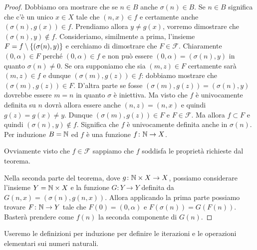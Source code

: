 \begin{proof}
Dobbiamo ora mostrare che se $n\in B$ anche $\sigma(n)\in B$.
Se $n\in B$ significa che c'è un unico $x\in X$ tale che $(n,x)\in f$
e certamente anche $(\sigma(n),g(x))\in f$.
Prendiamo allora $y\neq g(x)$, vorremo dimostrare che $(\sigma(n),y)\not \in f$.
Consideriamo, similmente a prima, l'insieme $F=f\setminus{\left\{ (\sigma(n),y) \right\}}$
e cerchiamo di dimostrare che $F\in \mathcal F$.
Chiaramente $(0,\alpha)\in F$ perché $(0,\alpha)\in f$ 
e non può essere $(0,\alpha)=(\sigma(n),y)$ in quanto $\sigma(n)\neq 0$.
Se ora supponiamo che sia $(m,z)\in F$ certamente sarà $(m,z)\in f$ 
e dunque $(\sigma(m),g(z))\in f$: 
dobbiamo mostrare che $(\sigma(m),g(z))\in F$. 
D'altra parte se fosse $(\sigma(m), g(z))=(\sigma(n),y)$ 
dovrebbe essere $m=n$ in quanto $\sigma$ è iniettiva. 
Ma visto che $f$ è univocamente definita su $n$ dovrà allora essere 
anche $(n,z) = (n,x)$ e quindi $g(z)=g(x) \neq y$. 
Dunque $(\sigma(m),g(z))\in F$ e $F\in \mathcal F$.
Ma allora $f\subset F$ e quindi $(\sigma(n),y)\not \in f$.
Significa che $f$ è univocamente definita anche in $\sigma(n)$.
Per induzione $B={\mathbb N}$ ed $f$ è una funzione $f\colon {\mathbb N}\to X$.

Ovviamente visto che $f\in \mathcal F$ sappiamo che $f$ 
soddisfa le proprietà richieste dal teorema.

Nella seconda parte del teorema, dove $g\colon {\mathbb N}\times X \to X$,
possiamo considerare l'insieme $Y={\mathbb N}\times X$ e la funzione 
$G\colon Y\to Y$ definita da $G(n,x) = (\sigma(n), g(n,x))$.
Allora applicando la prima parte possiamo trovare $F\colon {\mathbb N}\to Y$
tale che $F(0) = (0,\alpha)$ e $F(\sigma(n)) = G(F(n))$.
Basterà prendere come $f(n)$ la seconda componente di $G(n)$.
\end{proof}
  
Useremo le definizioni per induzione per definire le iterazioni e le operazioni elementari 
sui numeri naturali.

%
%
